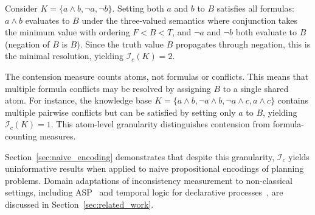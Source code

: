 \begin{example}
    Consider $K = \{a \land b, \neg a, \neg b\}$. Setting both $a$ and $b$ to $B$ satisfies all formulas: $a \land b$ evaluates to $B$ under the three-valued semantics where conjunction takes the minimum value with ordering $F < B < T$, and $\neg a$ and $\neg b$ both evaluate to $B$ (negation of $B$ is $B$). Since the truth value $B$ propagates through negation, this is the minimal resolution, yielding $\mathcal{I}_c(K) = 2$.
\end{example}

The contension measure counts atoms, not formulas or conflicts. This means that multiple formula conflicts may be resolved by assigning $B$ to a single shared atom. For instance, the knowledge base $K = \{a \land b, \neg a \land b, \neg a \land c, a \land c\}$ contains multiple pairwise conflicts but can be satisfied by setting only $a$ to $B$, yielding $\mathcal{I}_c(K) = 1$. This atom-level granularity distinguishes contension from formula-counting measures.

Section~\ref{sec:naive_encoding} demonstrates that despite this granularity, $\mathcal{I}_c$ yields uninformative results when applied to naive propositional encodings of planning problems. Domain adaptations of inconsistency measurement to non-classical settings, including \ac{ASP}~\cite{Ulbricht2016} and temporal logic for declarative processes~\cite{Corea2022}, are discussed in Section~\ref{sec:related_work}.
